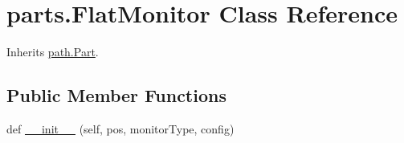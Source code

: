 \hypertarget{classparts_1_1_flat_monitor}{}\section{parts.\+Flat\+Monitor Class Reference}
\label{classparts_1_1_flat_monitor}


Inherits \hyperlink{classpath_1_1_part}{path.\+Part}.

\subsection*{Public Member Functions}
\begin{DoxyCompactItemize}
\item 
def \hyperlink{classparts_1_1_flat_monitor_a898e85713098a6dcbf1209d812af1e98}{\+\_\+\+\_\+init\+\_\+\+\_\+} (self, pos, monitor\+Type, config)
\end{DoxyCompactItemize}
